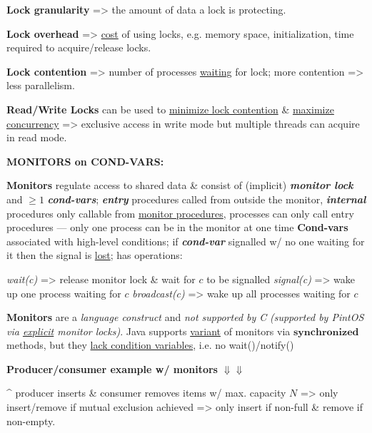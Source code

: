 \textbf{Lock granularity} => the amount of data a lock is protecting.

\textbf{Lock overhead} => \ul{cost} of using locks, e.g. memory space, initialization,
time required to acquire/release locks.

\textbf{Lock contention} =>  number of processes \ul{waiting} for lock; more contention => less parallelism.

\textbf{Read/Write Locks} can be used to \ul{minimize lock contention} \& \ul{maximize concurrency}  => exclusive access
in write mode but multiple threads can acquire in read mode.

\hSep


\hSep

\textbf{MONITORS on COND-VARS:}

\begin{enumerate}
    \vItem \textbf{Monitors} regulate access to shared data \& consist of (implicit) \textit{\textbf{monitor lock}}
    and $\geq 1$ \textit{\textbf{cond-vars}};
    \textit{\textbf{entry}} procedures called from outside the monitor, \textit{\textbf{internal}}
    procedures only callable from \ul{monitor procedures}, processes can only call entry procedures — only one
    process can be in the monitor at one time
    \vItem \textbf{Cond-vars} associated with high-level conditions; if \textit{\textbf{cond-var}}
    signalled w/ no one waiting for it then the signal is \ul{lost}; has operations:
    
    \begin{enumerate}
        \vItem \textcolor{cornellred}{\textit{wait(c)}} => 
        release monitor lock \& wait for $c$ to be signalled
        \vItem \textcolor{cornellred}{\textit{signal(c)}} => 
        wake up one process waiting for $c$
        \vItem \textcolor{cornellred}{\textit{broadcast(c)}} => 
        wake up all processes waiting for $c$
    \end{enumerate}

    \vItem \textbf{Monitors} are a \textit{language construct} and \textit{not supported by C}
    \textit{(supported by PintOS via \ul{explicit} monitor locks)}. Java supports \ul{variant} of monitors
    via $\mathbf{synchronized}$ methods, but they \ul{lack condition variables},
    i.e. no wait()/notify()
\end{enumerate}

\textbf{Producer/consumer example w/ monitors} $\Downarrow \Downarrow$

\^{} producer inserts \& consumer removes items w/ max. capacity $N$ => only insert/remove if mutual exclusion achieved
=> only insert if non-full \& remove if non-empty.

\hSep
